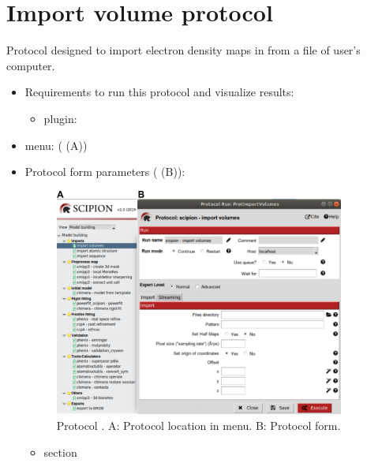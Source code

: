 \section{Import volume protocol}
\label{app:importVolume}%
Protocol designed to import electron density maps in \scipion from a file of user's computer.
   
 \begin{itemize}
  \item Requirements to run this protocol and visualize results:
    \begin{itemize}
        \item \scipion plugin: 
    \end{itemize}
  \item \scipion menu:
   ( (A))
  
  \item Protocol form parameters ( (B)):
  
  \begin{figure}[H]
    \centering 
    \captionsetup{width=.7\linewidth} 
    \includegraphics[width=0.90\textwidth]{Images_appendix/Fig100.pdf}
    \caption{Protocol . A: Protocol location in \scipion menu. B: Protocol form.}
    \label{fig:app_protocol_volume_1}
   \end{figure}
  
  \begin{itemize}
   \item {} section
  


\end{itemize}
\end{itemize}
